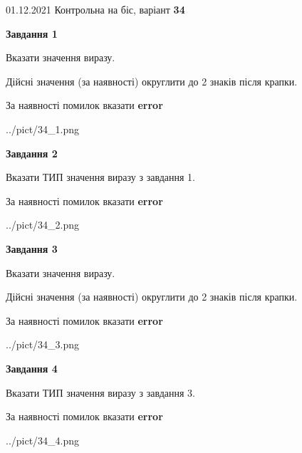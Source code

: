 \documentclass[11pt, ukrainian]{article}
\begin{document}
{01.12.2021 Контрольна на біс, варіант  \No \textbf { 34 }\par}
{
\begin {large}
{\begin {center}\textbf{Завдання 1}\end {center}}\par
Вказати значення виразу. \par
Дійсні значення (за наявності) округлити до 2 знаків після крапки. \par
За наявності помилок вказати \textbf{error}

\begin{center}
	{../pict/34_1.png}
\end{center}
\newpage

{\begin {center}\textbf{Завдання 2}\end {center}}\par
Вказати ТИП значення виразу з завдання 1. \par
За наявності помилок вказати \textbf{error}

\begin{center}
	{../pict/34_2.png}
\end{center}
\newpage

{\begin {center}\textbf{Завдання 3}\end {center}}\par
Вказати значення виразу. \par
Дійсні значення (за наявності) округлити до 2 знаків після крапки. \par
За наявності помилок вказати \textbf{error}

\begin{center}
	{../pict/34_3.png}
\end{center}
\newpage

{\begin {center}\textbf{Завдання 4}\end {center}}\par
Вказати ТИП значення виразу з завдання 3. \par
За наявності помилок вказати \textbf{error}

\begin{center}
	{../pict/34_4.png}
\end{center}
\newpage


\end{large}}
\end{document}
